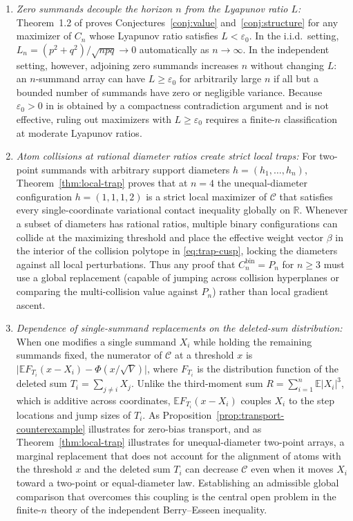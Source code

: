 \documentclass[11pt]{article}
\numberwithin{equation}{section}
\theoremstyle{definition}
\theoremstyle{remark}
\newcommand{\E}{\mathbb E}
\newcommand{\R}{\mathbb R}
\newcommand{\eps}{\varepsilon}
\begin{document}
\begin{enumerate}[label=(\arabic*),leftmargin=2em]
\item \emph{Zero summands decouple the horizon $n$ from the Lyapunov ratio $L$:}
Theorem~1.2 of \citet{BellSmallStructure2026} proves
Conjectures~\ref{conj:value} and~\ref{conj:structure} for any maximizer of
$C_n$ whose Lyapunov ratio satisfies $L<\eps_0$. In the i.i.d.\ setting,
$L_n=(p^2+q^2)/\sqrt{npq}\to0$ automatically as $n\to\infty$. In the
independent setting, however, adjoining zero summands increases $n$ without
changing $L$: an $n$-summand array can have $L\ge\eps_0$ for arbitrarily large
$n$ if all but a bounded number of summands have zero or negligible variance.
Because $\eps_0>0$ in \citet{BellSmallStructure2026} is obtained by a
compactness contradiction argument and is not effective, ruling out
maximizers with $L\ge\eps_0$ requires a finite-$n$ classification at moderate
Lyapunov ratios.

\item \emph{Atom collisions at rational diameter ratios create strict local
traps:}
For two-point summands with arbitrary support diameters $h=(h_1,\ldots,h_n)$,
Theorem~\ref{thm:local-trap} proves that at $n=4$ the unequal-diameter
configuration $h=(1,1,1,2)$ is a strict local maximizer of $\mathcal C$ that
satisfies every single-coordinate variational contact inequality globally on
$\R$. Whenever a subset of diameters has rational ratios, multiple binary
configurations can collide at the maximizing threshold and place the effective
weight vector $\beta$ in the interior of the collision polytope in
\eqref{eq:trap-cusp}, locking the diameters against all local perturbations.
Thus any proof that $C_n^{\mathrm{bin}}=P_n$ for $n\ge3$ must use a global
replacement (capable of jumping across collision hyperplanes or comparing the
multi-collision value against $P_n$) rather than local gradient ascent.

\item \emph{Dependence of single-summand replacements on the deleted-sum
distribution:}
When one modifies a single summand $X_i$ while holding the remaining summands
fixed, the numerator of $\mathcal C$ at a threshold $x$ is
$\bigl|\E F_{T_i}(x-X_i)-\Phi(x/\sqrt V)\bigr|$, where $F_{T_i}$ is the
distribution function of the deleted sum $T_i=\sum_{j\ne i}X_j$. Unlike the
third-moment sum $R=\sum_{i=1}^n\E|X_i|^3$, which is additive across
coordinates, $\E F_{T_i}(x-X_i)$ couples $X_i$ to the step locations and jump
sizes of $T_i$. As Proposition~\ref{prop:transport-counterexample}
illustrates for zero-bias transport, and as Theorem~\ref{thm:local-trap}
illustrates for unequal-diameter two-point arrays, a marginal replacement that
does not account for the alignment of atoms with the threshold $x$ and the
deleted sum $T_i$ can decrease $\mathcal C$ even when it moves $X_i$ toward a
two-point or equal-diameter law. Establishing an admissible global comparison
that overcomes this coupling is the central open problem in the finite-$n$
theory of the independent Berry--Esseen inequality.
\end{enumerate}



\end{document}
